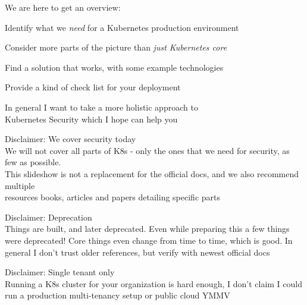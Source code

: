 \documentclass[Screen16to9,17pt]{foils}
\begin{document}
We are here to get an overview:
\begin{list2}
\item Identify what we \emph{need} for a Kubernetes production environment
\item Consider more parts of the picture than \emph{just Kubernetes core}
\item Find a solution that works, with some example technologies
\item Provide a kind of check list for your deployment
\end{list2}

\vskip 5mm
\begin{center}
In general I want to take a more holistic approach to\\
Kubernetes Security which I hope can help you
\end{center}



\begin{list2}
\item Disclaimer: We cover security today\\
We will not cover all parts of K8s  - only the ones that we need for security, as few as possible.\\
This slideshow is not a replacement for the official docs, and we also recommend multiple\\ resources books, articles and papers detailing specific parts

\item Disclaimer: Deprecation\\
Things are built, and later deprecated. Even while preparing this a few things were deprecated! Core things even change from time to time, which is good. In general I don't trust older references, but verify with newest official docs

\item Disclaimer: Single tenant only\\
Running a K8s cluster for your organization is hard enough, I don't claim I could run a production multi-tenancy setup or public cloud YMMV
\end{list2}

\end{document}

